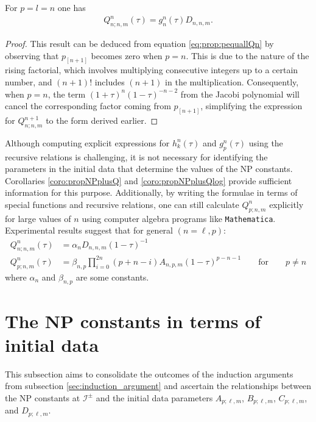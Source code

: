 \begin{corollary}\label{coro:propNPplusQlog}
  For $p=l=n$ one has
  \begin{align}\label{eq:ind_Qpequall_pequaln}
    Q^{n}_{n;n,m}(\tau) =g^n_n(\tau)D_{n,n,m}.
  \end{align}
\end{corollary}
\begin{proof}
  This result can be deduced from equation \eqref{eq:prop:pequallQn} by observing that $p_{[n+1]}$ becomes zero when $p=n$. This is due to the nature of the rising factorial, which involves multiplying consecutive integers up to a certain number, and $(n+1)!$ includes $(n+1)$ in the multiplication. Consequently, when $p=n$, the term $(1+\tau)^{n}(1-\tau)^{-n-2}$ from the Jacobi polynomial will cancel the corresponding factor coming from $p_{[n+1]}$, simplifying the expression for $Q^{n+1}_{n;n,m}$ to the form derived earlier.
\end{proof}


\begin{remark}\label{Remark:Qngen}
  Although computing explicit expressions for $h_{k}^{n}(\tau)$ and $g^{n}_{p}(\tau)$ using the recursive relations is challenging, it is not necessary for identifying the parameters in the initial data that determine the values of the NP constants. Corollaries \ref{coro:propNPplusQ} and \ref{coro:propNPplusQlog} provide sufficient information for this purpose. Additionally, by writing the formulae in terms of special functions and recursive relations, one can still calculate $Q^{n}_{p;n,m}$ explicitly for large values of $n$ using computer algebra programs like {\tt{Mathematica}}. Experimental results suggest that for general $(n=\ell,p)$:
  \begin{subequations}\label{rem:n}
    \begin{align}
      Q^{n}_{n;n,m}(\tau) &=\alpha_{n}D_{n,n,m}(1-\tau)^{-1} \\
      Q^{n}_{p;n,m}(\tau) &=\beta_{n,p}\prod_{i=0}^{2n} (p+n-i)A_{n,p,m}(1-\tau)^{p-n-1} \qquad \text{for}\qquad p\neq n
    \end{align}
    \end{subequations}
    where $\alpha_{n}$ and $\beta_{n,p}$ are some constants.  
\end{remark}
\section{The NP constants in terms of initial data}
\label{sec:NPconstantsInitialData}

This subsection aims to consolidate the outcomes of the induction arguments from subsection \ref{sec:induction_argument} and ascertain the relationships between the NP constants at $\mathscr{I}^{\pm}$ and the initial data parameters $A_{p;\ell,m}$, $B_{p;\ell,m}$, $C_{p;\ell,m}$, and $D_{p;\ell,m}$. \\

